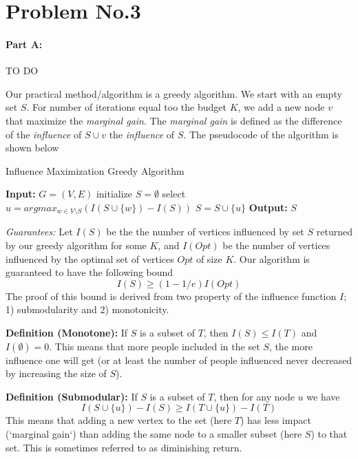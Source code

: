 \section*{Problem No.3} \label{sec:prob3}



\paragraph{Part A:}
\begin{Huge}
TO DO
\end{Huge}

Our practical method/algorithm is a greedy algorithm. We start with an empty set $S$. For number of iterations equal too the budget $K$, we add a new node $v$ that maximize the \emph{marginal gain}. The \emph{marginal gain} is defined as the difference of the \emph{influence} of $S \cup v$ the \emph{influence} of $S$. The pseudocode  of the algorithm is shown below

\begin{algorithm}
\caption{Influence Maximization Greedy Algorithm}\label{alg:euclid}
\begin{algorithmic}[1]
\State \textbf{Input:} $G=(V,E)$
\State initialize $S = \emptyset$
	\State select $u=argmax_{w\in V\setminus S}\left(I(S \cup \{w\}) - I(S)  \right)$
	\State $S = S \cup \{u\}$
\EndFor
\State \textbf{Output:} $S$
\end{algorithmic}
\end{algorithm}

\textit{Guarantees:} Let $I(S)$ be the the number of vertices influenced by set $S$ returned by our greedy algorithm for some $K$, and $I(Opt)$ be the number of vertices influenced by the optimal set of vertices $Opt$ of size $K$. Our algorithm is guaranteed to have the following bound
$$
I(S) \geq (1 - 1/e)I(Opt)
$$
The proof of this bound is derived from two property of the influence function $I$; 1) submodularity and 2) monotonicity.

\noindent
\textbf{Definition (Monotone):} If $S$ is a subset of $T$, then $I(S)\leq I(T)$ and $I(\emptyset)=0$. This means that more people included in the set $S$, the more influence one will get (or at least the number of people influenced never decreased by increasing the size of $S$). 

\noindent
\textbf{Definition (Submodular):} If $S$ is a subset of $T$, then for any node $u$ we have 
$$
I(S\cup \{u\}) - I(S) \geq I(T\cup\{u\})-I(T)
$$
This means that adding a new vertex to the set (here $T$) has less impact (`marginal gain`) than adding the same node to a smaller subset (here $S$) to that set. This is sometimes referred to as diminishing return.

